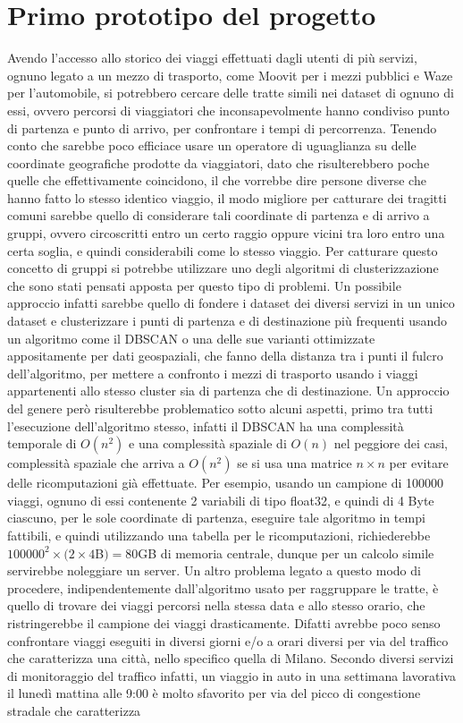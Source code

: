 \section{Primo prototipo del progetto}

Avendo l'accesso allo storico dei viaggi effettuati dagli utenti di più servizi, ognuno legato a un mezzo di trasporto, come Moovit per i mezzi pubblici e Waze per l'automobile, si potrebbero cercare delle tratte simili nei dataset di ognuno di essi, ovvero percorsi di viaggiatori che inconsapevolmente hanno condiviso punto di partenza e punto di arrivo, per confrontare i tempi di percorrenza. Tenendo conto che sarebbe poco efficiace usare un operatore di uguaglianza su delle coordinate geografiche prodotte da viaggiatori, dato che risulterebbero poche quelle che effettivamente coincidono, il che vorrebbe dire persone diverse che hanno fatto lo stesso identico viaggio, il modo migliore per catturare dei tragitti comuni sarebbe quello di considerare tali coordinate di partenza e di arrivo a gruppi, ovvero circoscritti entro un certo raggio oppure vicini tra loro entro una certa soglia, e quindi considerabili come lo stesso viaggio. Per catturare questo concetto di gruppi si potrebbe utilizzare uno degli algoritmi di clusterizzazione che sono stati pensati apposta per questo tipo di problemi. Un possibile approccio infatti sarebbe quello di fondere i dataset dei diversi servizi in un unico dataset e clusterizzare i punti di partenza e di destinazione più frequenti usando un algoritmo come il DBSCAN o una delle sue varianti ottimizzate appositamente per dati geospaziali, che fanno della distanza tra i punti il fulcro dell'algoritmo, per mettere a confronto i mezzi di trasporto usando i viaggi appartenenti allo stesso cluster sia di partenza che di destinazione\cite{ester1996}\cite{zhou2003}\cite{borah2004}. Un approccio del genere però risulterebbe problematico sotto alcuni aspetti, primo tra tutti l'esecuzione dell'algoritmo stesso, infatti il DBSCAN ha una complessità temporale di $O(n^{2})$ e una complessità spaziale di $O(n)$ nel peggiore dei casi, complessità spaziale che arriva a $O(n^2)$ se si usa una matrice $n \times n$ per evitare delle ricomputazioni già effettuate. Per esempio, usando un campione di 100000 viaggi, ognuno di essi contenente 2 variabili di tipo float32, e quindi di 4 Byte ciascuno, per le sole coordinate di partenza, eseguire tale algoritmo in tempi fattibili, e quindi utilizzando una tabella per le ricomputazioni, richiederebbe $100000^{2} \times (2 \times 4$B$) = 80 $GB di memoria centrale, dunque per un calcolo simile servirebbe noleggiare un server. Un altro problema legato a questo modo di procedere, indipendentemente dall'algoritmo usato per raggruppare le tratte, è quello di trovare dei viaggi percorsi nella stessa data e allo stesso orario, che ristringerebbe il campione dei viaggi drasticamente. Difatti avrebbe poco senso confrontare viaggi eseguiti in diversi giorni e/o a orari diversi per via del traffico che caratterizza una città, nello specifico quella di Milano. Secondo diversi servizi di monitoraggio del traffico infatti, un viaggio in auto in una settimana lavorativa il lunedì mattina alle 9:00 è molto sfavorito per via del picco di congestione stradale che caratterizza 